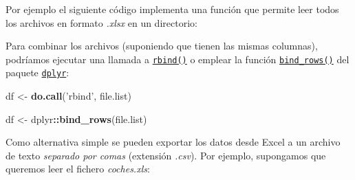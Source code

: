 \documentclass[
]{book}
\newenvironment{Shaded}{\begin{snugshade}}{\end{snugshade}}
\newcommand{\CharTok}[1]{\textcolor[rgb]{0.31,0.60,0.02}{#1}}
\newcommand{\CommentTok}[1]{\textcolor[rgb]{0.56,0.35,0.01}{\textit{#1}}}
\newcommand{\ControlFlowTok}[1]{\textcolor[rgb]{0.13,0.29,0.53}{\textbf{#1}}}
\newcommand{\DataTypeTok}[1]{\textcolor[rgb]{0.13,0.29,0.53}{#1}}
\newcommand{\KeywordTok}[1]{\textcolor[rgb]{0.13,0.29,0.53}{\textbf{#1}}}
\newcommand{\NormalTok}[1]{#1}
\newcommand{\OperatorTok}[1]{\textcolor[rgb]{0.81,0.36,0.00}{\textbf{#1}}}
\newcommand{\StringTok}[1]{\textcolor[rgb]{0.31,0.60,0.02}{#1}}
\begin{document}
Por ejemplo el siguiente código implementa una función que permite leer todos
los archivos en formato \emph{.xlsx} en un directorio:

\begin{Shaded}
\end{Shaded}

Para combinar los archivos (suponiendo que tienen las mismas columnas), podríamos ejecutar una llamada a \href{https://www.rdocumentation.org/packages/base/versions/3.6.1/topics/rbind}{\texttt{rbind()}}
o emplear la función \href{https://www.rdocumentation.org/packages/dplyr/versions/0.7.8/topics/bind}{\texttt{bind\_rows()}}
del paquete \href{https://dplyr.tidyverse.org}{\texttt{dplyr}}:

\begin{Shaded}
\begin{Highlighting}[]
\NormalTok{df <-}\StringTok{ }\KeywordTok{do.call}\NormalTok{(}\StringTok{'rbind'}\NormalTok{, file.list)}

\NormalTok{df <-}\StringTok{ }\NormalTok{dplyr}\OperatorTok{::}\KeywordTok{bind_rows}\NormalTok{(file.list)}
\end{Highlighting}
\end{Shaded}

Como alternativa simple se pueden exportar los datos desde Excel a un archivo de texto \emph{separado por comas} (extensión \emph{.csv}).
Por ejemplo, supongamos que queremos leer el fichero \emph{coches.xls}:
\end{document}
